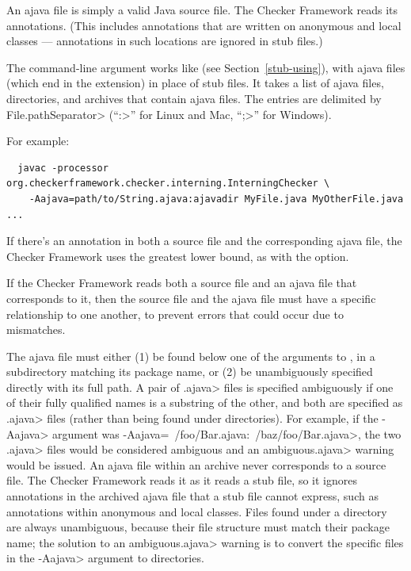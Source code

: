 An ajava file is simply a valid Java source file.
The Checker Framework reads its annotations.
(This includes annotations that are written
on anonymous and local classes --- annotations in such locations are ignored
in stub files.)



The  command-line argument works like  (see
Section~\ref{stub-using}), with ajava files (which end in the 
extension) in place of stub files.  It takes a list of
ajava files, directories, and archives that contain ajava files.
The entries are delimited by \<File.pathSeparator> (``\<:>'' for Linux and
Mac, ``\<;>'' for Windows).

For example:

\begin{myxsmall}
\begin{Verbatim}
  javac -processor org.checkerframework.checker.interning.InterningChecker \
    -Aajava=path/to/String.ajava:ajavadir MyFile.java MyOtherFile.java ...
\end{Verbatim}
\end{myxsmall}

If there's an annotation in both a source file and the corresponding ajava
file, the Checker Framework uses the greatest lower bound, as with
the \code{-AmergeStubsWithSource} option.




If the Checker Framework reads both a source file and an ajava file that
corresponds to it, then the source file and the ajava file must have a
specific relationship to one another, to prevent errors that could occur
due to mismatches.



The ajava file must either (1) be found below one of the arguments to
\code{-Aajava}, in a subdirectory matching its package name, or (2) be
unambiguously specified directly with its full path. A pair of \<.ajava>
files is specified ambiguously if one of their fully qualified names
is a substring of the other, and both are specified as \<.ajava> files (rather
than being found under directories). For example, if the \<-Aajava> argument
was \<-Aajava=~/foo/Bar.ajava:~/baz/foo/Bar.ajava>, the two \<.ajava> files
would be considered ambiguous and an \<ambiguous.ajava> warning would be issued.
An ajava file within an archive never corresponds to a source file.  The
Checker Framework reads it as it reads a stub file, so it ignores
annotations in the archived ajava file that a stub file cannot express,
such as annotations within anonymous and local classes.
Files found under a directory are always unambiguous, because their file structure
must match their package name; the solution to an \<ambiguous.ajava> warning is to
convert the specific files in the \<-Aajava> argument to directories.

